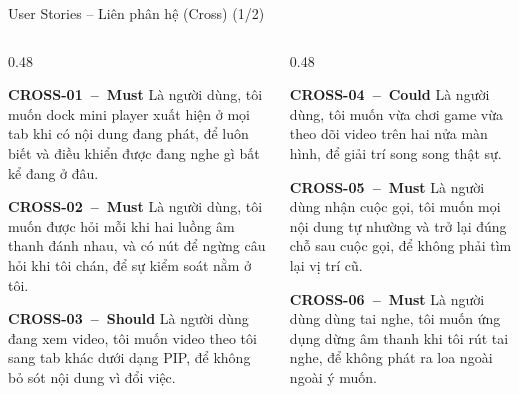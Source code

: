 \documentclass[aspectratio=169]{beamer}
\begin{document}
\begin{frame}{User Stories -- Liên phân hệ (Cross) (1/2)}
  \begin{columns}
    \begin{column}{0.48\textwidth}
      \begin{block}{\scriptsize\bfseries CROSS-01~--~Must}
        {\tiny Là người dùng, tôi muốn dock mini player xuất hiện ở mọi tab khi có nội dung đang phát, để luôn biết và điều khiển được đang nghe gì bất kể đang ở đâu.}
      \end{block}
      \begin{block}{\scriptsize\bfseries CROSS-02~--~Must}
        {\tiny Là người dùng, tôi muốn được hỏi mỗi khi hai luồng âm thanh đánh nhau, và có nút để ngừng câu hỏi khi tôi chán, để sự kiểm soát nằm ở tôi.}
      \end{block}
      \begin{block}{\scriptsize\bfseries CROSS-03~--~Should}
        {\tiny Là người dùng đang xem video, tôi muốn video theo tôi sang tab khác dưới dạng PIP, để không bỏ sót nội dung vì đổi việc.}
      \end{block}
    \end{column}
    \begin{column}{0.48\textwidth}
      \begin{block}{\scriptsize\bfseries CROSS-04~--~Could}
        {\tiny Là người dùng, tôi muốn vừa chơi game vừa theo dõi video trên hai nửa màn hình, để giải trí song song thật sự.}
      \end{block}
      \begin{block}{\scriptsize\bfseries CROSS-05~--~Must}
        {\tiny Là người dùng nhận cuộc gọi, tôi muốn mọi nội dung tự nhường và trở lại đúng chỗ sau cuộc gọi, để không phải tìm lại vị trí cũ.}
      \end{block}
      \begin{block}{\scriptsize\bfseries CROSS-06~--~Must}
        {\tiny Là người dùng dùng tai nghe, tôi muốn ứng dụng dừng âm thanh khi tôi rút tai nghe, để không phát ra loa ngoài ngoài ý muốn.}
      \end{block}
    \end{column}
  \end{columns}
\end{frame}
\end{document}
